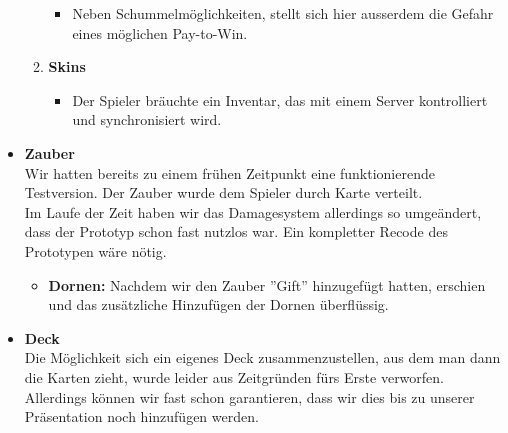 \begin{itemize}
\begin{enumerate}
        \begin{itemize}
            \item Neben Schummelmöglichkeiten, stellt sich hier ausserdem die Gefahr eines möglichen Pay-to-Win.
        \end{itemize}
        \item \textbf{Skins}
        \begin{itemize}
            \item Der Spieler bräuchte ein Inventar, das mit einem Server kontrolliert und synchronisiert wird. 
        \end{itemize}
    \end{enumerate}
    \item \textbf{Zauber} \\
        Wir hatten bereits zu einem frühen Zeitpunkt eine funktionierende Testversion. Der Zauber wurde dem Spieler durch Karte verteilt. \\
        Im Laufe der Zeit haben wir das Damagesystem allerdings so umgeändert, dass der Prototyp schon fast nutzlos war. Ein kompletter Recode des Prototypen wäre nötig.
    \begin{itemize}
        \item \textbf{Dornen:}
            Nachdem wir den Zauber ''Gift'' hinzugefügt hatten, erschien und das zusätzliche Hinzufügen der Dornen überflüssig.
    \end{itemize}
    \item \textbf{Deck} \\
        Die Möglichkeit sich ein eigenes Deck zusammenzustellen, aus dem man dann die Karten zieht, wurde leider aus Zeitgründen fürs Erste verworfen. Allerdings können wir
        fast schon garantieren, dass wir dies bis zu unserer Präsentation noch hinzufügen werden.     
\end{itemize}